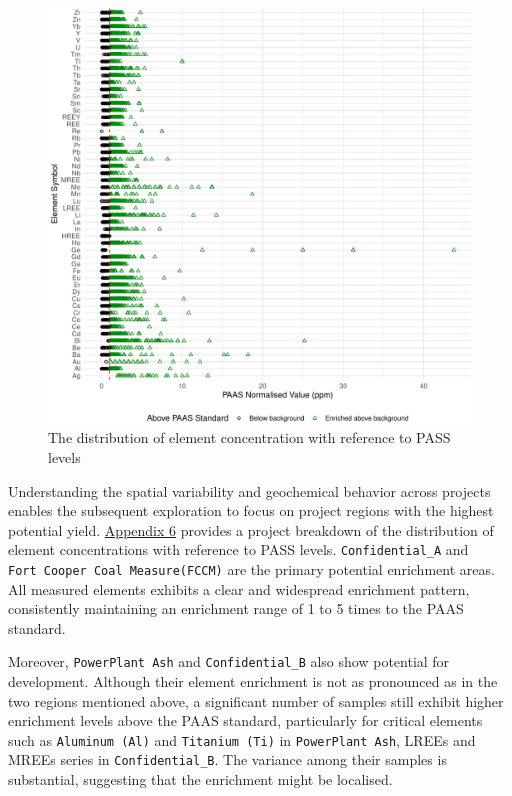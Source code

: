 \documentclass[11pt,a4paper,]{article}
\begin{document}
\begin{figure}
\includegraphics[width=1\linewidth,height=1\textheight]{Final_report_files/figure-latex/paaslvlcode-1} \caption{The distribution of element concentration with reference to PASS levels}\label{fig:paaslvlcode}
\end{figure}

Understanding the spatial variability and geochemical behavior across projects enables the subsequent exploration to focus on project regions with the highest potential yield. \hyperref[sec-appendixsix]{Appendix 6} provides a project breakdown of the distribution of element concentrations with reference to PASS levels. \texttt{Confidential\_A} and \texttt{Fort\ Cooper\ Coal\ Measure(FCCM)} are the primary potential enrichment areas. All measured elements exhibits a clear and widespread enrichment pattern, consistently maintaining an enrichment range of 1 to 5 times to the PAAS standard.

Moreover, \texttt{PowerPlant\ Ash} and \texttt{Confidential\_B} also show potential for development. Although their element enrichment is not as pronounced as in the two regions mentioned above, a significant number of samples still exhibit higher enrichment levels above the PAAS standard, particularly for critical elements such as \texttt{Aluminum\ (Al)} and \texttt{Titanium\ (Ti)} in \texttt{PowerPlant\ Ash}, LREEs and MREEs series in \texttt{Confidential\_B}. The variance among their samples is substantial, suggesting that the enrichment might be localised.
\end{document}

